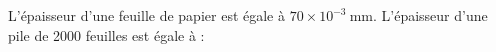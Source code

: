 
L'épaisseur d'une feuille de papier est égale à $70 \times 10^{-3} \mathrm{~mm}$. L'épaisseur d'une pile de 2000 feuilles est égale à :

\smallskip

